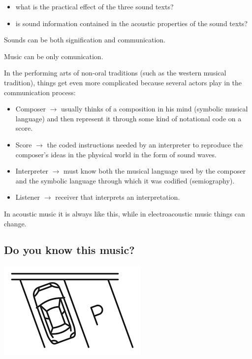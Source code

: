 \begin{itemize}
\tightlist
\item what is the practical effect of the three sound texts?
\item is sound information contained in the acoustic properties of the sound texts?
\end{itemize}

Sounds can be both signification and communication.

Music can be only comunication.

In the performing arts of non-oral traditions (such as the western musical tradition), things get even more complicated because several actors play in the communication process:

\begin{itemize}
\tightlist
\item Composer \(\rightarrow\) usually thinks of a composition in his mind (symbolic musical language) and then represent it through some kind of notational code on a score.
\item Score \(\rightarrow\) the coded instructions needed by an interpreter to reproduce the composer's ideas in the physical world in the form of sound waves.
\item Interpreter \(\rightarrow\) must know both the musical language used by the composer and the symbolic language through which it was codified (semiography).
\item Listener \(\rightarrow\) receiver that interprets an interpretation.
\end{itemize}

In acoustic music it is always like this, while in electroacoustic music things can change.

\subsection{Do you know this music? }\label{do-you-know-this-music}

\begin{center}
\includegraphics[scale=0.4]{../img/parcheggio.png}
\end{center}

